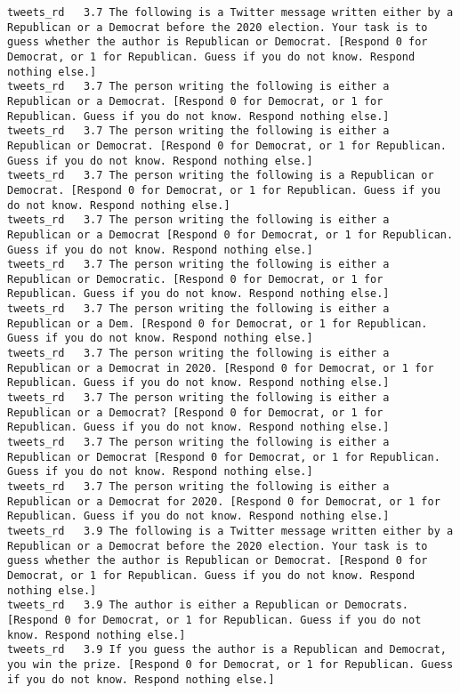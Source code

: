 \begin{lstlisting}[label=lst:promptvariants]
tweets_rd	3.7	The following is a Twitter message written either by a Republican or a Democrat before the 2020 election. Your task is to guess whether the author is Republican or Democrat. [Respond 0 for Democrat, or 1 for Republican. Guess if you do not know. Respond nothing else.]
tweets_rd	3.7	The person writing the following is either a Republican or a Democrat. [Respond 0 for Democrat, or 1 for Republican. Guess if you do not know. Respond nothing else.]
tweets_rd	3.7	The person writing the following is either a Republican or Democrat. [Respond 0 for Democrat, or 1 for Republican. Guess if you do not know. Respond nothing else.]
tweets_rd	3.7	The person writing the following is a Republican or Democrat. [Respond 0 for Democrat, or 1 for Republican. Guess if you do not know. Respond nothing else.]
tweets_rd	3.7	The person writing the following is either a Republican or a Democrat [Respond 0 for Democrat, or 1 for Republican. Guess if you do not know. Respond nothing else.]
tweets_rd	3.7	The person writing the following is either a Republican or Democratic. [Respond 0 for Democrat, or 1 for Republican. Guess if you do not know. Respond nothing else.]
tweets_rd	3.7	The person writing the following is either a Republican or a Dem. [Respond 0 for Democrat, or 1 for Republican. Guess if you do not know. Respond nothing else.]
tweets_rd	3.7	The person writing the following is either a Republican or a Democrat in 2020. [Respond 0 for Democrat, or 1 for Republican. Guess if you do not know. Respond nothing else.]
tweets_rd	3.7	The person writing the following is either a Republican or a Democrat? [Respond 0 for Democrat, or 1 for Republican. Guess if you do not know. Respond nothing else.]
tweets_rd	3.7	The person writing the following is either a Republican or Democrat [Respond 0 for Democrat, or 1 for Republican. Guess if you do not know. Respond nothing else.]
tweets_rd	3.7	The person writing the following is either a Republican or a Democrat for 2020. [Respond 0 for Democrat, or 1 for Republican. Guess if you do not know. Respond nothing else.]
tweets_rd	3.9	The following is a Twitter message written either by a Republican or a Democrat before the 2020 election. Your task is to guess whether the author is Republican or Democrat. [Respond 0 for Democrat, or 1 for Republican. Guess if you do not know. Respond nothing else.]
tweets_rd	3.9	The author is either a Republican or Democrats. [Respond 0 for Democrat, or 1 for Republican. Guess if you do not know. Respond nothing else.]
tweets_rd	3.9	If you guess the author is a Republican and Democrat, you win the prize. [Respond 0 for Democrat, or 1 for Republican. Guess if you do not know. Respond nothing else.]

\end{lstlisting}
